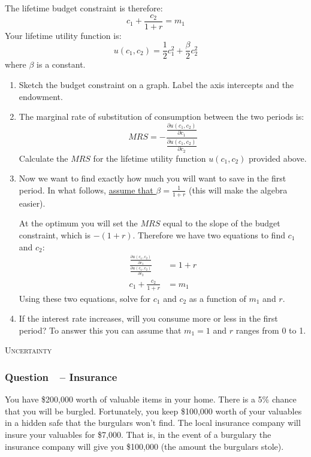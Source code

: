 \documentclass[12pt]{article}
\newcommand{\topic}[1]{\medskip\begin{center}\large\textsc{#1}\normalsize
  \end{center}}
\newcounter{question}[section]
\newcommand{\question}[1]{\refstepcounter{question}
  \subsubsection*{Question~\thequestion~-- #1}}
\newenvironment{subquestions}{
  \begin{enumerate}[label=(\roman*)]}{\end{enumerate}}
\begin{document}
The lifetime budget constraint is therefore:
\[
  c_1 + \frac{c_2}{1+r} = m_1
\]
Your lifetime utility function is:
\[
  u\left( c_1,c_2 \right)=\frac{1}{2}c_1^2 + \frac{\beta}{2}c_2^2
\]
where $\beta$ is a constant.
\begin{subquestions}
  \item Sketch the budget constraint on a graph. Label the axis intercepts and
    the endowment.
  \item The marginal rate of substitution of consumption between the two
    periods is:
    \[
      MRS = - \frac{\frac{\partial u\left( c_1,c_2 \right)}{\partial c_1}}
                   {\frac{\partial u\left( c_1,c_2 \right)}{\partial c_2}}
    \]
    Calculate the $MRS$ for the lifetime utility function $u\left( c_1,c_2
    \right)$ provided above.
  \item Now we want to find exactly how much you will want to save in the first
    period. In what follows, \underline{assume that $\beta = \frac{1}{1+r}$}
    (this will make the algebra easier).

    At the optimum you will set the $MRS$ equal to the slope of the budget
    constraint, which is $-\left( 1+r \right)$.
    Therefore we have two equations to find $c_1$ and $c_2$:
    \begin{align}
      \frac{\frac{\partial u\left( c_1,c_2 \right)}{\partial c_1}}
           {\frac{\partial u\left( c_1,c_2 \right)}{\partial c_2}} &=
           1+r  \\
             c_1 + \frac{c_2}{1+r} &= m_1
    \end{align}
    Using these two equations, solve for $c_1$ and $c_2$ as a function of $m_1$
    and $r$.
  \item If the interest rate increases, will you consume more or less in the
    first period? To answer this you can assume that $m_1=1$ and $r$ ranges from
    0 to 1.
  \end{subquestions}
\newpage
\topic{Uncertainty}
\question{Insurance}
You have \$200,000 worth of valuable items in your home. There is a 5\% chance
that you will be burgled. Fortunately, you keep \$100,000 worth of your
valuables in a hidden safe that the burgulars won't find. The local insurance
company will insure your valuables for \$7,000. That is, in the event of a
burgulary the insurance company will give you \$100,000 (the amount the
burgulars stole).
\end{document}
